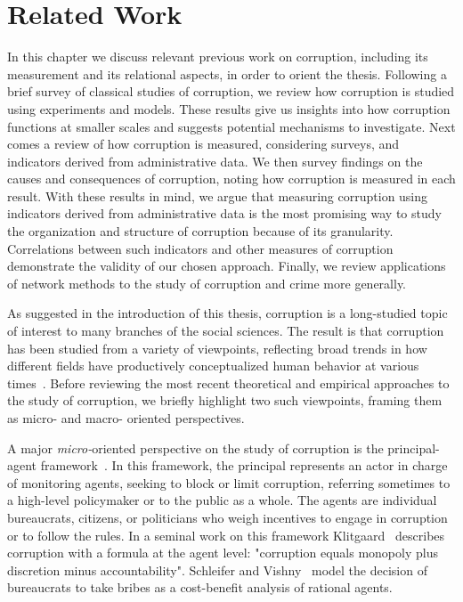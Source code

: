 \chapter{Related Work}

In this chapter we discuss relevant previous work on corruption, including its measurement and its relational aspects, in order to orient the thesis. Following a brief survey of classical studies of corruption, we review how corruption is studied using experiments and models. These results give us insights into how corruption functions at smaller scales and suggests potential mechanisms to investigate. Next comes a review of how corruption is measured, considering surveys, and indicators derived from administrative data. We then survey findings on the causes and consequences of corruption, noting how corruption is measured in each result. With these results in mind, we argue that measuring corruption using indicators derived from administrative data is the most promising way to study the organization and structure of corruption because of its granularity. Correlations between such indicators and other measures of corruption demonstrate the validity of our chosen approach. Finally, we review applications of network methods to the study of corruption and crime more generally.

As suggested in the introduction of this thesis, corruption is a long-studied topic of interest to many branches of the social sciences. The result is that corruption has been studied from a variety of viewpoints, reflecting broad trends in how different fields have productively conceptualized human behavior at various times~\cite{elster2015explaining}. Before reviewing the most recent theoretical and empirical approaches to the study of corruption, we briefly highlight two such viewpoints, framing them as micro- and macro- oriented perspectives. 

A major \textit{micro-}oriented perspective on the study of corruption is the principal-agent framework~\cite{klitgaard1988controlling}. In this framework, the principal represents an actor in charge of monitoring agents, seeking to block or limit corruption, referring sometimes to a high-level policymaker or to the public as a whole. The agents are individual bureaucrats, citizens, or politicians who weigh incentives to engage in corruption or to follow the rules. In a seminal work on this framework Klitgaard~\cite{klitgaard1988controlling} describes corruption with a formula at the agent level: "corruption equals monopoly plus discretion minus accountability". Schleifer and Vishny~\cite{shleifer1993corruption} model the decision of bureaucrats to take bribes as a cost-benefit analysis of rational agents. 

